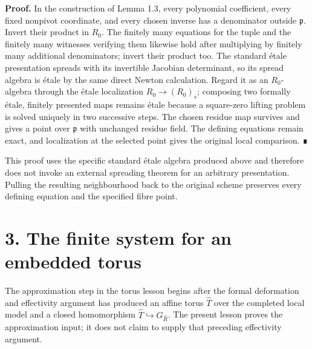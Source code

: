 \documentclass[11pt,a4paper,openany]{report}
\begin{document}
\textbf{Proof.} In the construction of Lemma 1.3, every polynomial coefficient, every fixed nonpivot coordinate, and every chosen inverse has a denominator outside \(\mathfrak p\). Invert their product in \(R_0\). The finitely many equations for the tuple and the finitely many witnesses verifying them likewise hold after multiplying by finitely many additional denominators; invert their product too. The standard étale presentation spreads with its invertible Jacobian determinant, so its spread algebra is étale by the same direct Newton calculation. Regard it as an \(R_0\)-algebra through the étale localization \(R_0\to(R_0)_s\); composing two formally étale, finitely presented maps remains étale because a square-zero lifting problem is solved uniquely in two successive steps. The chosen residue map survives and gives a point over \(\mathfrak p\) with unchanged residue field. The defining equations remain exact, and localization at the selected point gives the original local comparison. ∎

This proof uses the specific standard étale algebra produced above and therefore does not invoke an external spreading theorem for an arbitrary presentation. Pulling the resulting neighbourhood back to the original scheme preserves every defining equation and the specified fibre point.

\section{3. The finite system for an embedded torus}\label{AG-RG-S05-the-finite-system-for-an-embedded-torus}

The approximation step in the torus lesson begins after the formal deformation and effectivity argument has produced an affine torus \(\widehat T\) over the completed local model and a closed homomorphism \(\widehat T\hookrightarrow G_{\widehat R}\). The present lesson proves the approximation input; it does not claim to supply that preceding effectivity argument.

\label{AG-RG-S05-finite-complete-local-splitting}
\end{document}
